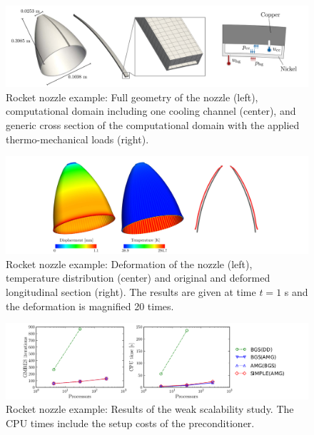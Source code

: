 \documentclass{article}
\begin{document}
\begin{figure}[ht!]
\includegraphics[width=\textwidth]{../_assets/fig12.png}
\caption{Rocket nozzle example: Full geometry of the nozzle (left), computational domain including one cooling channel (center), and generic cross section of the computational domain with the applied thermo-mechanical loads (right). }
\label{fig:tsi-rocket-geom}
\end{figure}

%
\begin{figure}[ht!]
\includegraphics[width=\textwidth]{../_assets/fig13.png}
\caption{Rocket nozzle example: Deformation of the nozzle (left), temperature distribution (center) and original and deformed longitudinal section (right). The results are given at time $t=1$ s and the deformation is magnified 20 times. }
\label{fig:tsi-rocket-sol}
\end{figure}
%
\begin{figure}[ht!]
\includegraphics[width=\textwidth]{../_assets/fig14.png}
\caption{Rocket nozzle example: Results of the weak scalability study.  The CPU times include the setup costs of the preconditioner.}
\label{fig:tsi-rocket-weak-scal}
\end{figure}
\end{document}
